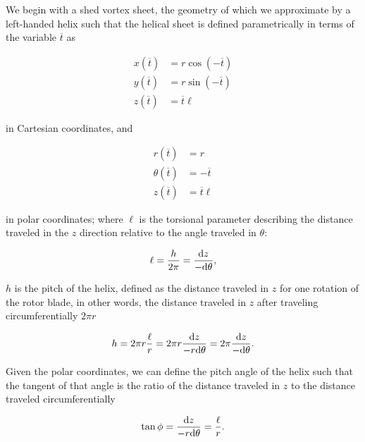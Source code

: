 We begin with a shed vortex sheet, the geometry of which we approximate by a left-handed helix such that the helical sheet is defined parametrically in terms of the variable \(\overline{t}\) as

\begin{equation}
    \begin{aligned}
        x(\overline{t}) &= r \cos (-\overline{t}) \\
        y(\overline{t}) &= r \sin (-\overline{t}) \\
        z(\overline{t}) &=  \overline{t} \ell
    \end{aligned}
\end{equation}

\noindent in Cartesian coordinates, and

\begin{equation}
    \begin{aligned}
        r(\overline{t}) &= r \\
        \theta(\overline{t}) &= -\overline{t} \\
        z(\overline{t}) &=  \overline{t} \ell
    \end{aligned}
\end{equation}

\noindent in polar coordinates; where \(\ell\) is the torsional parameter describing the distance traveled in the \(z\) direction relative to the angle traveled in \(\theta\):

 \begin{equation}
     \ell = \frac{h}{2\pi} = \frac{\mathrm{d} z}{-\mathrm{d}\theta},
 \end{equation}

 \where  \(h\) is the pitch of the helix, defined as the distance traveled in \(z\) for one rotation of the rotor blade, in other words, the distance traveled in \(z\) after traveling circumferentially \(2\pi r\)

 \begin{equation}
     h = 2\pi r \frac{\ell}{r} = 2\pi r  \frac{\mathrm{d} z}{-r\mathrm{d} \theta} = 2\pi  \frac{\mathrm{d} z}{-\mathrm{d} \theta}.
 \end{equation}

Given the polar coordinates, we can define the pitch angle of the helix such that the tangent of that angle is the ratio of the distance traveled in \(z\) to the distance traveled circumferentially

\begin{equation}
    \tan \phi = \frac{\mathrm{d} z}{-r\mathrm{d} \theta} = \frac{\ell}{r}.
\end{equation}

